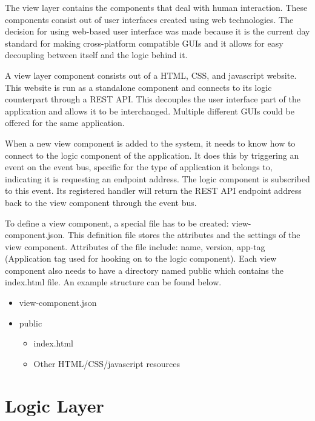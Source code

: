 
The view layer contains the components that deal with human interaction. These components consist out of user interfaces created using web technologies. The decision for using web-based user interface was made because it is the current day standard for making cross-platform compatible GUIs and it allows for easy decoupling between itself and the logic behind it.

A view layer component consists out of a HTML, CSS, and javascript website. This website is run as a standalone component and connects to its logic counterpart through a REST API. This decouples the user interface part of the application and allows it to be interchanged. Multiple different GUIs could be offered for the same application.

When a new view component is added to the system, it needs to know how to connect to the logic component of the application. It does this by triggering an event on the event bus, specific for the type of application it belongs to, indicating it is requesting an endpoint address. The logic component is subscribed to this event. Its registered handler will return the REST API endpoint address back to the view component through the event bus.

To define a view component, a special file has to be created: view-component.json. This definition file stores the attributes and the settings of the view component. Attributes of the file include: name, version, app-tag (Application tag used for hooking on to the logic component). Each view component also needs to have a directory named public which contains the index.html file. An example structure can be found below.

\begin{itemize}
	\item view-component.json
	\item public \begin{itemize}
		\item index.html
		\item Other HTML/CSS/javascript resources
	\end{itemize}
\end{itemize}


\section{Logic Layer}

